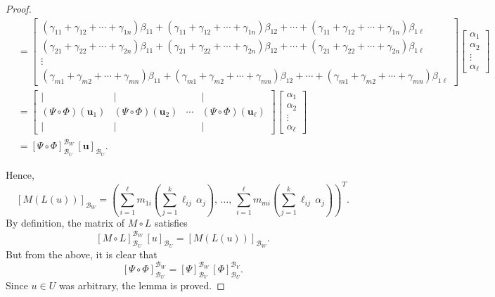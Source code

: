 \documentclass[11pt,openany]{article}
\renewcommand{\vec}[1]{\mathbf{#1}}
\begin{document}
\begin{observation}
\begin{proof}
\begin{align*}
&=\begin{bmatrix}
	(\gamma_{11}+\gamma_{12}+\cdots+\gamma_{1n})\beta_{11} + (\gamma_{11}+\gamma_{12}+\cdots+\gamma_{1n})\beta_{12} + \cdots + (\gamma_{11}+\gamma_{12}+\cdots+\gamma_{1n})\beta_{1\ell}\\
	(\gamma_{21}+\gamma_{22}+\cdots+\gamma_{2n})\beta_{11} + (\gamma_{21}+\gamma_{22}+\cdots+\gamma_{2n})\beta_{12} + \cdots + (\gamma_{21}+\gamma_{22}+\cdots+\gamma_{2n})\beta_{1\ell}\\
	\vdots\\
	(\gamma_{m1}+\gamma_{m2}+\cdots+\gamma_{mn})\beta_{11} + (\gamma_{m1}+\gamma_{m2}+\cdots+\gamma_{mn})\beta_{12} + \cdots + (\gamma_{m1}+\gamma_{m2}+\cdots+\gamma_{mn})\beta_{1\ell}
\end{bmatrix}\begin{bmatrix}
\alpha_1 \\ \alpha_2 \\ \vdots \\ \alpha_\ell
\end{bmatrix}\\
&=\begin{bmatrix}
	\mid & \mid & & \mid \\
	(\Psi\circ\Phi)(\vec{u}_1) &(\Psi\circ\Phi)(\vec{u}_2) & \cdots & (\Psi\circ\Phi)(\vec{u}_\ell) \\
	\mid & \mid & & \mid
\end{bmatrix}\begin{bmatrix}
	\alpha_1 \\ \alpha_2 \\ \vdots \\ \alpha_\ell
\end{bmatrix}\\
&= [\Psi\circ\Phi]_{\mathcal{B}_U}^{\mathcal{B}_W}\,[\vec{u}]_{\mathcal{B}_U}.
\end{align*}

Hence,
\[
[M(L(u))]_{\mathcal{B}_W} = \left(\sum_{i=1}^{\ell} m_{1i}\left(\sum_{j=1}^{k}\ell_{ij}\,\alpha_j\right),\,\ldots,\,\sum_{i=1}^{\ell} m_{mi}\left(\sum_{j=1}^{k}\ell_{ij}\,\alpha_j\right)\right)^T.
\]
By definition, the matrix of \(M\circ L\) satisfies
\[
[M\circ L]_{\mathcal{B}_U}^{\mathcal{B}_W}\,[u]_{\mathcal{B}_U} = [M(L(u))]_{\mathcal{B}_W}.
\]
But from the above, it is clear that
\[
[\Psi\circ \Phi]_{\mathcal{B}_U}^{\mathcal{B}_W} = [\Psi]_{\mathcal{B}_V}^{\mathcal{B}_W}\,[\Phi]_{\mathcal{B}_U}^{\mathcal{B}_V}.
\]
Since \(u\in U\) was arbitrary, the lemma is proved.
\end{proof}



\end{observation}
\end{document}
